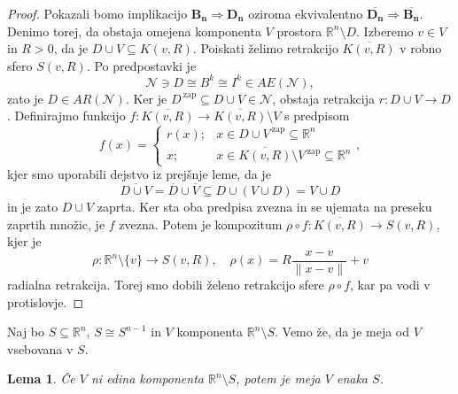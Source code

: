 \documentclass[10pt, a4paper]{article}
\newtheorem{lema}[izr]{Lema}
\newenvironment{noticeC}{%
  \tcolorbox[%
  notitle,
  empty,
  enhanced,  %
  breakable,
  coltext=black, 
  fontupper=\rmfamily,
  noparskip,
  sharp corners,
  boxrule=-1pt,  %
  frame hidden,
  left=7pt,  %
  right=7pt,
  top=5pt,
  bottom=5pt,
  before skip=2.5ex plus 2pt,
  after skip=2.5ex plus 2pt,
  overlay unbroken and last={%
  },
  ]}
{\endtcolorbox}
\newenvironment{dokaz}%
  {\begin{noticeC}\begin{proof}}%
  {\end{proof}\end{noticeC}}
\newcommand{\R}{\mathbb {R}}
\begin{document}
\begin{dokaz}
  Pokazali bomo implikacijo $\mathbf{B_n} \Rightarrow \mathbf{D_n}$ oziroma ekvivalentno $\overline{\mathbf{D_n}} \Rightarrow \overline{\mathbf{B_n}}$. Denimo torej, da obstaja omejena komponenta $V$ prostora $\R^n \setminus D$.
  Izberemo $v \in V$ in $R > 0$, da je $D \cup V \subseteq K(v, R)$. Poiskati želimo retrakcijo $\overline{K(v, R)}$ v robno 
  sfero $S(v, R)$. Po predpostavki je 
  $$\mathcal{N} \ni D \cong B^k \cong I^k \in AE(\mathcal{N}),$$
  zato je $D \in AR(\mathcal{N})$. Ker je $D^{\ \text{zap}} \subseteq D \cup V \in \mathcal{N}$, obstaja retrakcija 
  $r: D \cup V \to D$. Definirajmo funkcijo $f: \overline{K(v, R)} \to \overline{K(v, R)} \setminus V$ s predpisom 
  $$f(x) = \begin{cases}
    r(x) ;& x \in D \cup V^{\ \text{zap}} \subseteq \R^n\\
    x ;& x \in \overline{K(v, R)} \setminus V^{\ \text{zap}} \subseteq \R^n
  \end{cases},$$
  kjer smo uporabili dejstvo iz prejšnje leme, da je $$\overline{D \cup V} = \overline{D} \cup \overline{V} \subseteq D \cup (V \cup D) = V \cup D$$
  in je zato $D \cup V$ zaprta. Ker sta oba predpisa zvezna in se ujemata na preseku zaprtih množic,
  je $f$ zvezna. Potem je kompozitum $\rho \circ f: \overline{K(v, R)} \to S(v, R)$, kjer je 
  $$\rho: \R^n \setminus \{v\} \to S(v, R),\quad \rho (x) = R \frac{x - v}{\|x - v\|} + v$$
  radialna retrakcija. Torej smo dobili želeno retrakcijo sfere $\rho \circ f$, kar pa vodi v protislovje.
\end{dokaz}

Naj bo $S \subseteq \R^n$, $S \cong S^{n - 1}$ in $V$ komponenta $\R^n \setminus S$. Vemo že,
da je meja od $V$ vsebovana v $S$.

\begin{lema}
  Če $V$ ni edina komponenta $\R^n \setminus S$, potem je meja $V$ enaka $S$.
\end{lema}
\end{document}

